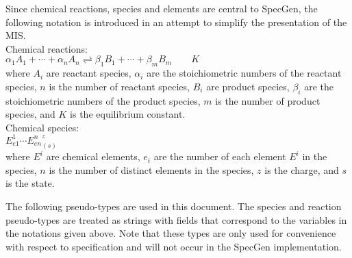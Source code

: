 \documentclass[12pt, titlepage]{article}
\newcommand{\progname}{SpecGen}
\begin{document}
\noindent
Since chemical reactions, species and elements are central to \progname{}, the following 
notation is introduced in an attempt to simplify the presentation of the MIS.\\

\noindent
Chemical reactions:\\

${\alpha}_1 {A}_{1} + \cdots + {\alpha}_n {A}_{n} 
    \rightleftharpoons {\beta}_1 {B}_{1} + \cdots + {\beta}_m {B}_{m} \qquad K$\\

where $A_i$ are reactant species, $\alpha_i$ are the stoichiometric numbers
of the reactant species, $n$ is the number of reactant species, $B_i$ are product species,
$\beta_i$ are the stoichiometric numbers of the product species, $m$ is the number of
product species, and $K$ is the equilibrium constant.\\

\noindent
Chemical species:\\

${{E}^1_{e1}}\cdots{{E}^n_{en}}^{z}_{(s)}$\\

where $E^i$ are chemical elements, $e_i$ are the number of each element $E^i$ in
the species, $n$ is the number of distinct elements in the species, $z$ is the
charge, and $s$ is the state.\\ 

\noindent
The following pseudo-types are used in this document.  The species and 
reaction pseudo-types are treated as strings with fields that correspond to the variables
in the notations given above.  Note that these types are only used for convenience with
respect to specification and
will not occur in the \progname{} implementation.
\end{document}
